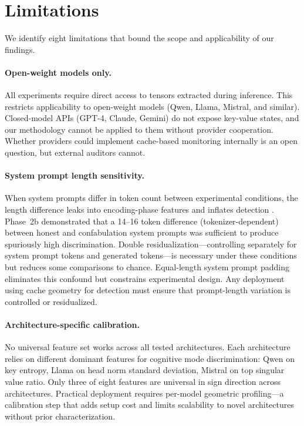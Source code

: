 
\section{Limitations}
\label{sec:limitations}

We identify eight limitations that bound the scope and applicability of our findings.

\paragraph{Open-weight models only.}
All experiments require direct access to \kvcache tensors extracted during inference.
This restricts applicability to open-weight models (Qwen, Llama, Mistral, and similar).
Closed-model APIs (GPT-4, Claude, Gemini) do not expose key-value states, and our methodology cannot be applied to them without provider cooperation.
Whether providers could implement cache-based monitoring internally is an open question, but external auditors cannot.

\paragraph{System prompt length sensitivity.}
When system prompts differ in token count between experimental conditions, the length difference leaks into encoding-phase features and inflates detection \auroc.
Phase~2b demonstrated that a 14--16 token difference (tokenizer-dependent) between honest and confabulation system prompts was sufficient to produce spuriously high discrimination.
Double residualization---controlling separately for system prompt tokens and generated tokens---is necessary under these conditions but reduces some comparisons to chance.
Equal-length system prompt padding eliminates this confound but constrains experimental design.
Any deployment using cache geometry for detection must ensure that prompt-length variation is controlled or residualized.

\paragraph{Architecture-specific calibration.}
No universal feature set works across all tested architectures.
Each architecture relies on different dominant features for cognitive mode discrimination: Qwen on key entropy, Llama on head norm standard deviation, Mistral on top singular value ratio.
Only three of eight features are universal in sign direction across architectures.
Practical deployment requires per-model geometric profiling---a calibration step that adds setup cost and limits scalability to novel architectures without prior characterization.

